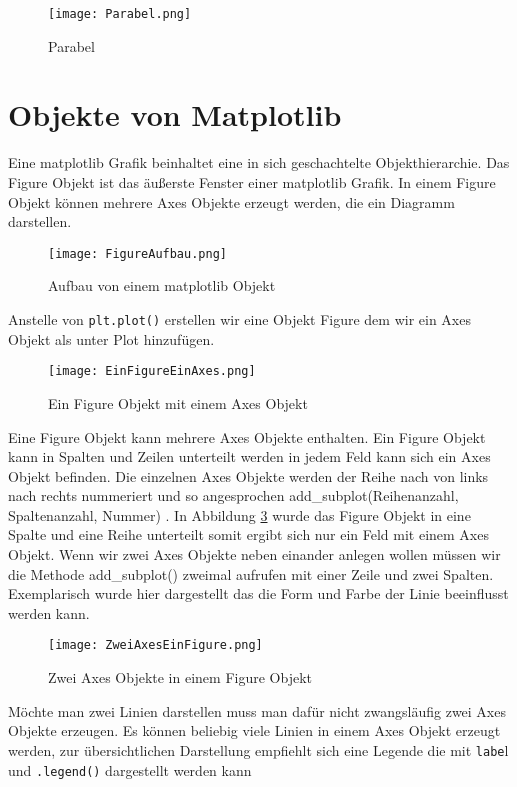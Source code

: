 \begin{figure}[!htb]
\texttt{[image: Parabel.png]}
\caption{Parabel}
\label{img:Parabel}
\end{figure}

\section{Objekte von Matplotlib} \label{sec:Objekte von Matplotlib}

Eine matplotlib Grafik beinhaltet eine in sich geschachtelte Objekthierarchie. Das Figure Objekt ist das äußerste Fenster einer matplotlib Grafik. In einem Figure Objekt können mehrere Axes Objekte erzeugt werden, die ein Diagramm darstellen.

\begin{figure}[!htb]
\centering
\texttt{[image: FigureAufbau.png]}
\caption{Aufbau von einem matplotlib Objekt \cite{matplotlib}}
\label{img:FigureObjekt}
\end{figure}

Anstelle von \texttt{plt.plot()} erstellen wir eine Objekt Figure dem wir ein Axes Objekt als unter Plot hinzufügen.

\begin{figure}[!htb]
\texttt{[image: EinFigureEinAxes.png]}
\caption{Ein Figure Objekt mit einem Axes Objekt}
\label{img:EinFigureEinAxes}
\end{figure}

Eine Figure Objekt kann mehrere Axes Objekte enthalten. Ein Figure Objekt kann in Spalten und Zeilen unterteilt werden in jedem Feld kann sich ein Axes Objekt befinden. Die einzelnen Axes Objekte werden der Reihe nach von links nach rechts nummeriert und so angesprochen add\_subplot(Reihenanzahl, Spaltenanzahl, Nummer) .  In Abbildung \ref{img:EinFigureEinAxes} wurde das Figure Objekt in eine Spalte und eine Reihe unterteilt somit ergibt sich nur ein Feld mit einem Axes Objekt. Wenn wir zwei Axes Objekte neben einander anlegen wollen müssen wir die Methode add\_subplot() zweimal aufrufen mit einer Zeile und zwei Spalten. 
Exemplarisch wurde hier dargestellt das die Form und Farbe der Linie beeinflusst werden kann. 

\begin{figure}[!htb]
\texttt{[image: ZweiAxesEinFigure.png]}
\caption{Zwei Axes Objekte in einem Figure Objekt}
\label{img:ZweiAxesEinFigure}
\end{figure}

Möchte man zwei Linien darstellen muss man dafür nicht zwangsläufig zwei Axes Objekte erzeugen. Es können beliebig viele Linien in einem Axes Objekt erzeugt werden, zur übersichtlichen Darstellung empfiehlt sich eine Legende die mit \texttt{labe}l und \texttt{.legend()} dargestellt werden kann

